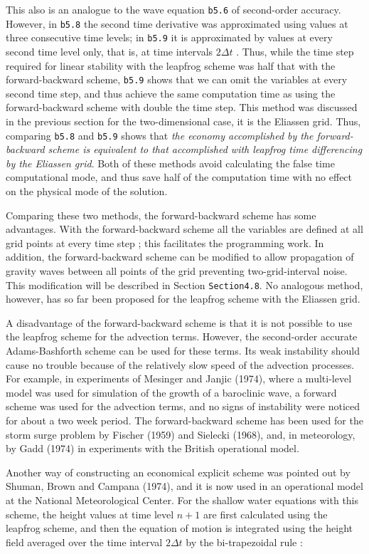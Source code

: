 This also is an analogue to the wave equation \texttt{b5.6} of
second-order accuracy. However, in \texttt{b5.8} the second time
derivative was approximated using values at three consecutive time
levels; in \texttt{b5.9} it is approximated by values at every second
time level only, that is, at time intervals \(2\Delta t\) . Thus, while
the time step required for linear stability with the leapfrog scheme was
half that with the forward-backward scheme, \texttt{b5.9} shows that we
can omit the variables at every second time step, and thus achieve the
same computation time as using the forward-backward scheme with double
the time step. This method was discussed in the previous section for the
two-dimensional case, it is the Eliassen grid. Thus, comparing
\texttt{b5.8} and \texttt{b5.9} shows that \emph{the economy
accomplished by the forward-backward scheme is equivalent to that
accomplished with leapfrog time differencing by the Eliassen grid}. Both
of these methods avoid calculating the false time computational mode,
and thus save half of the computation time with no effect on the
physical mode of the solution.

Comparing these two methods, the forward-backward scheme has some
advantages. With the forward-backward scheme all the variables are
defined at all grid points at every time step ; this facilitates the
programming work. In addition, the forward-backward scheme can be
modified to allow propagation of gravity waves between all points of the
grid preventing two-grid-interval noise. This modification will be
described in Section \texttt{Section4.8}. No analogous method, however,
has so far been proposed for the leapfrog scheme with the Eliassen grid.

A disadvantage of the forward-backward scheme is that it is not possible
to use the leapfrog scheme for the advection terms. However, the
second-order accurate Adams-Bashforth scheme can be used for these
terms. Its weak instability should cause no trouble because of the
relatively slow speed of the advection processes. For example, in
experiments of Mesinger and Janjic (1974), where a multi-level model was
used for simulation of the growth of a baroclinic wave, a forward scheme
was used for the advection terms, and no signs of instability were
noticed for about a two week period. The forward-backward scheme has
been used for the storm surge problem by Fischer (1959) and Sielecki
(1968), and, in meteorology, by Gadd (1974) in experiments with the
British operational model.

Another way of constructing an economical explicit scheme was pointed
out by Shuman, Brown and Campana (1974), and it is now used in an
operational model at the National Meteorological Center. For the shallow
water equations with this scheme, the height values at time level
\(n + 1\) are first calculated using the leapfrog scheme, and then the
equation of motion is integrated using the height field averaged over
the time interval \(2\Delta t\) by the bi-trapezoidal rule :

